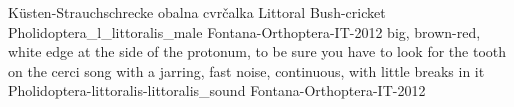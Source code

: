 {K\"usten-Strauchschrecke} %
{obalna cvr\v{c}alka} %
{Littoral Bush-cricket} %
{Pholidoptera_l_littoralis_male} {Fontana-Orthoptera-IT-2012} %
{} {} %
{big, brown-red, white edge at the side of the protonum, to be sure you have to look for the tooth on the cerci} %
{song with a jarring, fast noise, continuous, with little breaks in it} %
{Pholidoptera-littoralis-littoralis_sound} {Fontana-Orthoptera-IT-2012} %

